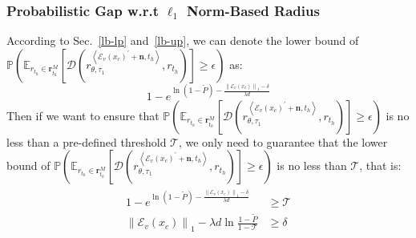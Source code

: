 \subsubsection{Probabilistic Gap w.r.t $\ell_1$ Norm-Based Radius}
According to Sec.~\ref{lb-lp} and~\ref{lb-up}, we can denote the lower bound of $\mathbb{P}(\mathbb{E}_{r_{t_h}\in\mathbf{r}_{t_h}^M}[\mathcal{D}(r_{\theta, \tau_1}^{\left<\mathcal{E}_v(x_c)^{\prime}+\mathbf{n}, t_h\right>}, r_{t_h})]\geq\epsilon)$ as:
\begin{equation}
1 - e^{\ln(1-\tilde{P})-\frac{\left\|\mathcal{E}_v(x_c)\right\|_1 - \delta}{\lambda d}}
\end{equation}
Then if we want to ensure that $\mathbb{P}(\mathbb{E}_{r_{t_h}\in\mathbf{r}_{t_h}^M}[\mathcal{D}(r_{\theta, \tau_1}^{\left<\mathcal{E}_v(x_c)^{\prime}+\mathbf{n}, t_h\right>}, r_{t_h})]\geq\epsilon)$ is no less than a pre-defined threshold $\mathcal{T}$, we only need to guarantee that the lower bound of $\mathbb{P}(\mathbb{E}_{r_{t_h}\in\mathbf{r}_{t_h}^M}[\mathcal{D}(r_{\theta, \tau_1}^{\left<\mathcal{E}_v(x_c)^{\prime}+\mathbf{n}, t_h\right>}, r_{t_h})]\geq\epsilon)$ is no less than $\mathcal{T}$, that is:
\begin{align}
\begin{split}
1 - e^{\ln(1-\tilde{P})-\frac{\left\|\mathcal{E}_v(x_c)\right\|_1 - \delta}{\lambda d}} &\geq \mathcal{T}\\
\left\|\mathcal{E}_v(x_c)\right\|_1 - \lambda d\ln\frac{1-\tilde{P}}{1-\mathcal{T}} &\geq\delta 
\end{split}
\end{align}

